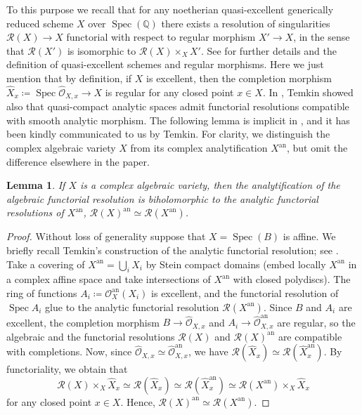\documentclass[JEP,XML,SOM,Unicode, NoEqCountersInSection,NoFloatCountersInSection,published]{cedram}
\let\mathcal\mathscr
\newtheorem{lem}[thm]{Lemma}
\theoremstyle{definition}
\newcommand{\QQ}{\mathbb{Q}}
\newcommand{\Spec}{\operatorname{Spec}}
\begin{document}
To this purpose we recall that for any noetherian quasi-excellent generically reduced scheme $X$ over $\Spec(\QQ)$ there exists a resolution of singularities $\mathcal{R}(X) \to X$ functorial with respect to regular morphism $X' \to X$, in the sense that $\mathcal{R}(X')$ is isomorphic to $\mathcal{R}(X) \times_{X} X'$. See \cite{Temkin2012} for further details and the definition of quasi-excellent schemes and regular morphisms. Here we just mention that by definition, if $X$ is excellent, then the completion morphism $\widehat{X}_x \coloneqq \Spec \widehat{\mathcal{O}}_{X,x} \to X$ is regular for any closed point $x \in X$. In \cite[Th.\,5.2.2]{Temkin2012}, Temkin showed also that quasi-compact analytic spaces admit functorial resolutions compatible with smooth analytic morphism. The following lemma is implicit in \cite{Temkin2012}, and it has been kindly communicated to us by Temkin. For clarity, we distinguish the complex algebraic variety $X$ from its complex analytification $X^{\mathrm{an}}$, but omit the difference elsewhere in the paper.
\begin{lem}\label{lem:analalg}
If $X$ is a complex algebraic variety, then the analytification of the algebraic functorial resolution is biholomorphic to the analytic functorial resolutions of $X^{\mathrm{an}}$, \ie
$\mathcal{R}(X)^{\mathrm{an}} \simeq \mathcal{R}(X^{\mathrm{an}})$.
\end{lem}
\begin{proof} Without loss of generality suppose that $X=\Spec(B)$ is affine.
We briefly recall Temkin's construction of the analytic functorial resolution; see \cite[Th.\,5.2.2]{Temkin2012}. Take a covering of $X^{\mathrm{an}} = \bigcup_{i} X_i$ by Stein compact domains (\eg embed locally $X^{\mathrm{an}}$ in a complex affine space and take intersections of $X^{\mathrm{an}}$ with closed polydiscs). The ring of functions $A_i \coloneqq \mathcal{O}^{\mathrm{an}}_{X}(X_i)$ is excellent, and the functorial resolution of $\Spec A_i$ glue to the analytic functorial resolution $\mathcal{R}(X^{\mathrm{an}})$. Since $B$ and $A_i$ are excellent, the completion morphism $B \to \widehat{\mathcal{O}}_{X, x}$ and $A_i \to \widehat{\mathcal{O}}^{\mathrm{an}}_{X, x}$ are regular, so the algebraic and the functorial resolutions $\mathcal{R}(X)$ and $\mathcal{R}(X)^{\mathrm{an}}$ are compatible with completions. Now, since $\widehat{\mathcal{O}}_{X, x}\simeq \widehat{\mathcal{O}}^{\mathrm{an}}_{X, x}$, we have $\mathcal{R}(\widehat{X}_x)\simeq \mathcal{R}(\widehat{X}^{\mathrm{an}}_x)$. By functoriality, we obtain that
\[
\mathcal{R}(X) \times_X \widehat{X}_x \simeq \mathcal{R}(\widehat{X}_x)\simeq \mathcal{R}(\widehat{X}^{\mathrm{an}}_x) \simeq \mathcal{R}(X^{\mathrm{an}}) \times_X \widehat{X}_x
\]
for any closed point $x \in X$. Hence, $\mathcal{R}(X)^{\mathrm{an}} \simeq \mathcal{R}(X^{\mathrm{an}})$.
\end{proof}
\end{document}
